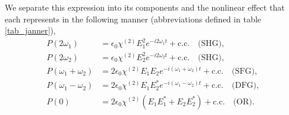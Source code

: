 \documentclass[10pt]{article}
\begin{document}
We separate this expression into its components and the nonlinear effect that each represents in the following manner (abbreviations defined in table \ref{tab_janner}),
\begin{align}
P(2\omega_{1}) &= \epsilon_{0}\chi^{(2)}E^{2}_{1}e^{-i2\omega_{1}t} + \text{c.c.}\quad\text{(SHG)},\nonumber\\
P(2\omega_{2}) &= \epsilon_{0}\chi^{(2)}E^{2}_{2}e^{-i2\omega_{2}t} + \text{c.c.}\quad\text{(SHG)},\nonumber\\
P(\omega_{1}+\omega_{2}) &= 2\epsilon_{0}\chi^{(2)}E_{1}E_{2}e^{-i(\omega_{1}+\omega_{2})t} + \text{c.c.}\quad\text{(SFG)},\label{eq_list}\\
P(\omega_{1}-\omega_{2}) &= 2\epsilon_{0}\chi^{(2)}E_{1}E^{\ast}_{2}e^{-i(\omega_{1}-\omega_{2})t} + \text{c.c.}\quad\text{(DFG)},\nonumber\\
P(0) &= 2\epsilon_{0}\chi^{(2)}\left(E_{1}E^{\ast}_{1} + E_{2}E^{\ast}_{2}\right) + \text{c.c.}\quad\text{(OR)}.\nonumber
\end{align}
\end{document}
